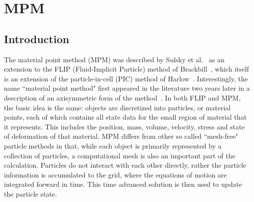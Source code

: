 
\newcommand{\tn}[1]{\mbox{\bf{#1}}}
\newcommand{\sig}{\mbox{\boldmath $\sigma \!\!$ \unboldmath}}
\newcommand{\bnabla} {\mbox{\boldmath $\nabla \!\!$ \unboldmath}}
\newcommand{\taubold} {\mbox{\boldmath $\tau \!\!$ \unboldmath}}
\newcommand{\f}{\ensuremath{f^{\theta}_r} }

\newcommand{\Texp}{\rm{exp}}
\newcommand{\Text}{\rm{ext}}
\newcommand{\Tint}{\rm{int}}
\newcommand{\Teq}{\rm{eq}}
\newcommand{\Delt}{\ensuremath{\Delta t}}
\newcommand{\Ep}{\ensuremath{\epsilon_p}}
\newcommand{\Epdot}[1]{\ensuremath{\dot{\epsilon}_{p#1}}}
\def\bfE{{\bf E}}
\newcommand{\BD}{\ensuremath{\boldsymbol{D}}}
\newcommand{\Half}{\ensuremath{\frac{1}{2}}}
\newcommand{\Bsig}{\ensuremath{\boldsymbol{\sigma}}}
\newcommand{\Bn}{\ensuremath{\boldsymbol{n}}}
\newcommand{\Bg}{\ensuremath{\boldsymbol{g}}}

\def\rmd{{\rm d}}
\def\rme{{\rm e}}
\def\rmf{{\rm f}}
\def\rmr{{\rm r}}
\def\rmR{{\rm R}}
\def\rms{{\rm s}}
\def\bfE{{\bf E}}
\def\bfF{{\bf F}}
\def\bff{{\bf f}}
\def\bfg{{\bf g}}
\def\bfI{{\bf I}}
\def\bfj{{\bf j}}
\def\bfm{{\bf m}}
\def\bfr{{\bf r}}
\def\bfx{{\bf x}}
\def\bfu{{\bf u}}
\def\rmg{{\rm g}}
\def\bfa{{\bf a}}
\def\bfG{{\bf G}}
\def\bfv{{\bf v}}
\def\tdot{{\textstyle\cdot}}

\section{MPM} \label{Sec:MPM}

\subsection{Introduction}

The material point method (MPM) was described by Sulsky et al.~\cite{sulskycmame,sulskycpc} as
an extension to the FLIP (Fluid-Implicit Particle) method of
Brackbill~\cite{brackbill-ruppel86}, which itself is an
extension of the particle-in-cell (PIC) method of
Harlow~\cite{harlow1963}.  Interestingly, the name ``material point method"
first appeared in the literature two years later in a description of
an axisymmetric form of the method~\cite{sulsky_axisym_1996}.  In both
FLIP and MPM, the basic idea is the same: objects are discretized into
particles, or material points, each of which contains all state data for the
small region of material that it represents.  This includes the position, mass, volume,
velocity, stress and state of deformation of that material.  MPM differs from
other so called ``mesh-free" particle methods in that, while each object
is primarily represented by a collection of particles, a computational mesh
is also an important part of the calculation.  Particles do not interact
with each other directly, rather the particle information is accumulated
to the grid, where the equations of motion are integrated forward in time.
This time advanced solution is then used to update the particle state.

